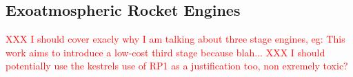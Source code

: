 




\subsection{Exoatmospheric Rocket Engines}
\textcolor{red}{XXX I should cover exacly why I am talking about three stage engines, eg: This work aims to introduce a low-cost third stage because blah...}
\textcolor{red}{XXX I should potentially use the kestrels use of RP1 as a justification too, non exremely toxic?}

